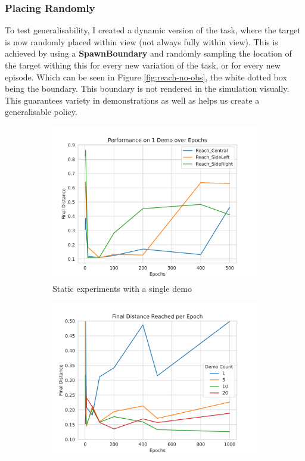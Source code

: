 \subsubsection{Placing Randomly}
To test generalisability, I created a dynamic version of the task, where the target is now randomly placed within view (not always fully within view). This is achieved by using a \textbf{SpawnBoundary} and randomly sampling the location of the target withing this for every new variation of the task, or for every new episode. Which can be seen in Figure \ref{fig:reach-no-obs}, the white dotted box being the boundary. This boundary is not rendered in the simulation visually. This guarantees variety in demonstrations as well as helps us create a generalisable policy.

\begin{figure}[htpb] %
  \begin{subfigure}{0.3\linewidth}
    \centering
    \includegraphics[width=\linewidth]{assets/cam-comb/reach-no-obs/rno_static.png}
    \caption{Static experiments with a single demo}\label{subfig:rno-static}
  \end{subfigure}
  \begin{subfigure}{0.3\linewidth}
    \centering
    \includegraphics[width=\linewidth]{assets/cam-comb/reach-no-obs/rno_random-dist.png}

\end{subfigure}
\end{figure}
